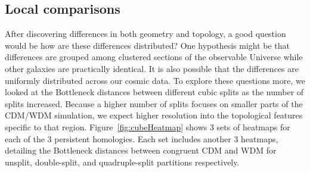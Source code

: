 \documentclass[12pt]{article}
\newcommand{\figref}[1]{Figure~\ref{#1}}
\begin{document}
\subsection{Local comparisons}
After discovering differences in both geometry and topology, a good question would be how are these differences distributed? One hypothesis might be that differences are grouped among clustered sections of the observable Universe while other galaxies are practically identical. It is also possible that the differences are uniformly distributed across our cosmic data. To explore these questions more, we looked at the Bottleneck distances between different cubic splits as the number of splits increased. Because a higher number of splits focuses on smaller parts of the CDM/WDM simulation, we expect higher resolution into the topological features specific to that region. \figref{fig:cubeHeatmap} shows 3 sets of heatmaps for each of the 3 persistent homologies. Each set includes another 3 heatmaps, detailing the Bottleneck distances between congruent CDM and WDM for unsplit, double-split, and quadruple-split partitions respectively.
\end{document}

